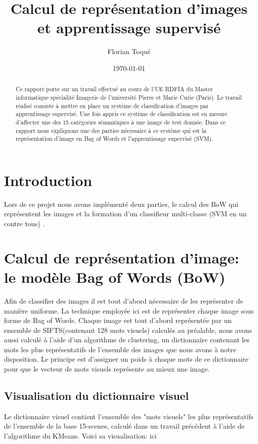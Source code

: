 \documentclass[a4paper]{article}
\title{Calcul de représentation d'images et apprentissage supervisé}
\author{Florian Toqué}
\date{\today}
\begin{document}
\maketitle

\begin{abstract}

Ce rapport porte sur un travail effectué au cours de l'UE RDFIA du Master informatique spécialité Imagerie de l'université Pierre et Marie Curie (Paris). Le travail réalisé consiste à mettre en place un système de classification d’images par apprentissage supervisé. Une fois appris ce système de classification est en mesure d’affecter une des 15 catégories sémantiques à une image de test donnée. Dans ce rapport nous expliquons une des parties nécessaire à ce système qui est la représentation d'image en Bag of Words et l'apprentissage supervisé (SVM). 
\end{abstract}

\section{Introduction}
Lors de ce projet nous avons implémenté deux parties, le calcul des BoW qui représentent les images et la formation d'un classifieur multi-classe (SVM en un contre tous) .


\section{Calcul de représentation d'image: le modèle Bag of Words (BoW)}
Afin de classifier des images il est tout d'abord nécessaire de les représenter de manière uniforme. La technique employée ici est de représenter chaque image sous forme de Bag of Words. Chaque image est tout d'abord représentée par un ensemble de SIFTS(contenant 128 mots visuels) calculés au préalable, nous avons aussi calculé à l'aide d'un algorithme de clustering, un dictionnaire contenant les mots les plus représentatifs de l'ensemble des images que nous avons à notre disposition. Le principe est d'assigner un poids à chaque mots de ce dictionnaire pour que le vecteur de mots visuels représente au mieux une image. 
\subsection{Visualisation du dictionnaire visuel}
Le dictionnaire visuel contient l'ensemble des "mots visuels" les plus représentatifs de l'ensemble de la base 15-scenes, calculé dans un travail précédent à l'aide de l'algorithme du KMeans. Voici sa visualisation: ici
\end{document}
